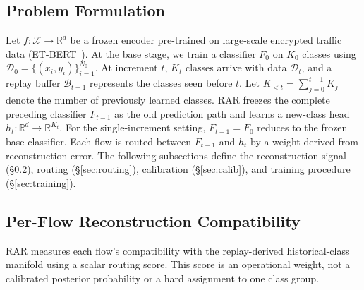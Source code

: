 \subsection{Problem Formulation}

Let $f: \mathcal{X} \to \mathbb{R}^d$ be a frozen encoder pre-trained on large-scale encrypted traffic data (ET-BERT~\cite{lin2022etbert}). At the base stage, we train a classifier $F_0$ on $K_0$ classes using $\mathcal{D}_0 = \{(x_i,y_i)\}_{i=1}^{N_0}$. At increment $t$, $K_t$ classes arrive with data $\mathcal{D}_t$, and a replay buffer $\mathcal{B}_{t-1}$ represents the classes seen before $t$. Let $K_{<t}=\sum_{j=0}^{t-1}K_j$ denote the number of previously learned classes. RAR freezes the complete preceding classifier $F_{t-1}$ as the old prediction path and learns a new-class head $h_t:\mathbb{R}^d\to\mathbb{R}^{K_t}$. For the single-increment setting, $F_{t-1}=F_0$ reduces to the frozen base classifier. Each flow is routed between $F_{t-1}$ and $h_t$ by a weight derived from reconstruction error. The following subsections define the reconstruction signal (\S\ref{sec:knowledge}), routing (\S\ref{sec:routing}), calibration (\S\ref{sec:calib}), and training procedure (\S\ref{sec:training}).

\subsection{Per-Flow Reconstruction Compatibility}\label{sec:knowledge}

RAR measures each flow's compatibility with the replay-derived historical-class manifold using a scalar routing score. This score is an operational weight, not a calibrated posterior probability or a hard assignment to one class group.

